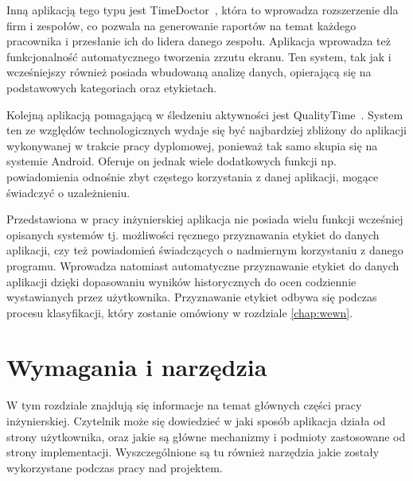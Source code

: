 \documentclass[a4paper,twoside,12pt]{book}
\begin{document}
Inną aplikacją tego typu jest TimeDoctor~\cite{time_doctor}, która to wprowadza rozszerzenie dla firm i zespołów, co pozwala na generowanie raportów na temat każdego pracownika i przesłanie ich do lidera danego zespołu. Aplikacja wprowadza też funkcjonalność automatycznego tworzenia zrzutu ekranu. Ten system, tak jak i wcześniejszy również posiada wbudowaną analizę danych, opierającą się na podstawowych kategoriach oraz etykietach.

Kolejną aplikacją pomagającą w śledzeniu aktywności jest QualityTime~\cite{quality_time}. System ten ze względów technologicznych wydaje się być najbardziej zbliżony do aplikacji wykonywanej w trakcie pracy dyplomowej, ponieważ tak samo skupia się na systemie Android. Oferuje on jednak wiele dodatkowych funkcji np. powiadomienia odnośnie zbyt częstego korzystania z danej aplikacji, mogące świadczyć o uzależnieniu.



Przedstawiona w pracy inżynierskiej aplikacja nie posiada wielu funkcji wcześniej opisanych systemów tj. możliwości ręcznego przyznawania etykiet do danych aplikacji, czy też powiadomień świadczących o nadmiernym korzystaniu z danego programu. Wprowadza natomiast automatyczne przyznawanie etykiet do danych aplikacji dzięki dopasowaniu wyników historycznych do ocen codziennie wystawianych przez użytkownika. Przyznawanie etykiet odbywa się podczas procesu klasyfikacji, który zostanie omówiony w rozdziale \ref{chap:wewn}. 





\chapter{Wymagania i narzędzia}
\label{chap:tools}
W tym rozdziale znajdują się informacje na temat głównych części pracy inżynierskiej. Czytelnik może się dowiedzieć w jaki sposób aplikacja działa od strony użytkownika, oraz jakie są główne mechanizmy i podmioty zastosowane od strony implementacji. Wyszczególnione są tu również narzędzia jakie zostały wykorzystane podczas pracy nad projektem.
\end{document}
